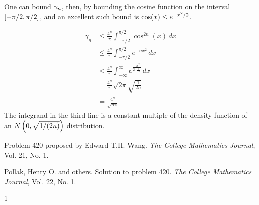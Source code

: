 One can bound $\displaystyle \gamma_n$, then, by bounding the cosine function on the interval $\displaystyle [-\pi/2, \pi/2]$, and an excellent such bound is $\displaystyle \cos(x) \leq e^{-x^2/2}$. 

\begin{align*}
 \gamma_n &\leq \frac{4^n}{\pi} \int_{-\pi/2}^{\pi/2} \cos^{2n}(x)\, dx \\
 &\leq\frac{4^n}{\pi} \int_{-\pi/2}^{\pi/2} e^{-nx^2}\, dx \\
 &< \frac{4^n}{\pi} \int_{-\infty}^{\infty} e^{\frac{-x^2}{2\cdot \frac{1}{2n}}}\, dx \\
 &= \frac{4^n}{\pi} \sqrt{2 \pi} \sqrt{\frac{1}{2n}} \\
 &= \frac{4^n}{\sqrt{n \pi}}
\end{align*}
The integrand in the third line is a constant multiple of the density function of an $\displaystyle N \left(0, \sqrt{1/(2n)}\right)$ distribution.

\begin{thebibliography}{1}

  Problem 420 proposed by Edward T.H. Wang. \textit{The College Mathematics Journal}, Vol. 21, No. 1.

 Pollak, Henry O. and others. Solution to problem 420. \textit{The College Mathematics Journal}, Vol. 22, No. 1.

\end{thebibliography}{1}



